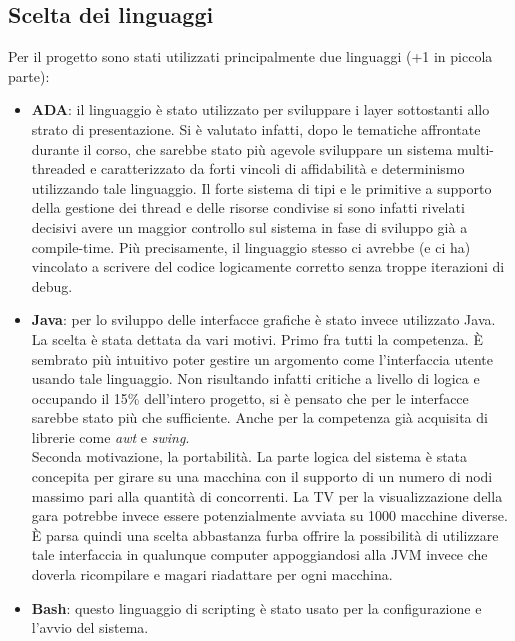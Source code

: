 \subsection{Scelta dei linguaggi}
Per il progetto sono stati utilizzati principalmente due linguaggi (+1 in piccola parte):
\begin{itemize}
\item \textbf{ADA}: il linguaggio \`{e} stato utilizzato per sviluppare i layer sottostanti allo strato di presentazione. Si \`{e} valutato infatti,
dopo le tematiche affrontate durante il corso, che sarebbe stato pi\`{u} agevole sviluppare un sistema multi-threaded e caratterizzato
da forti vincoli di affidabilit\`{a} e determinismo utilizzando tale linguaggio. Il forte sistema di tipi e le primitive a supporto della gestione
dei thread e delle risorse condivise si sono infatti rivelati decisivi avere un maggior controllo sul sistema in fase di sviluppo gi\`{a} 
a compile-time. Pi\`{u} precisamente, il linguaggio stesso ci avrebbe (e ci ha) vincolato a scrivere del codice logicamente corretto senza
troppe iterazioni di debug.
\item \textbf{Java}: per lo sviluppo delle interfacce grafiche \`{e} stato invece utilizzato Java. La scelta \`{e} stata dettata da vari motivi.
Primo fra tutti la competenza. \`{E} sembrato pi\`{u} intuitivo poter gestire un argomento come l'interfaccia utente usando tale linguaggio.
Non risultando infatti critiche a livello di logica e occupando il 15\% dell'intero progetto, si \`{e} pensato che per le interfacce sarebbe
stato pi\`{u} che sufficiente. Anche per la competenza gi\`{a} acquisita di librerie come \emph{awt} e \emph{swing}.\\
Seconda motivazione, la portabilit\`{a}. La parte logica del sistema \`{e} stata concepita per girare su una macchina con il supporto di un numero di
nodi massimo pari alla quantit\`{a} di concorrenti. La TV per la visualizzazione della gara potrebbe invece essere potenzialmente avviata
su 1000 macchine diverse. \`{E} parsa quindi una scelta abbastanza furba offrire la possibilit\`{a} di utilizzare tale interfaccia in qualunque
computer appoggiandosi alla JVM invece che doverla ricompilare e magari riadattare per ogni macchina.
\item \textbf{Bash}: questo linguaggio di scripting \`{e} stato usato per la configurazione e l'avvio del sistema.
\end{itemize}

